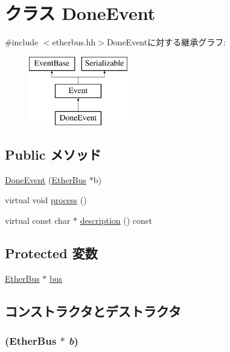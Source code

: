 \hypertarget{classEtherBus_1_1DoneEvent}{
\section{クラス DoneEvent}
\label{classEtherBus_1_1DoneEvent}
}


{\ttfamily \#include $<$etherbus.hh$>$}DoneEventに対する継承グラフ:\begin{figure}[H]
\begin{center}
\leavevmode
\includegraphics[height=3cm]{classEtherBus_1_1DoneEvent}
\end{center}
\end{figure}
\subsection*{Public メソッド}
\begin{DoxyCompactItemize}
\item 
\hyperlink{classEtherBus_1_1DoneEvent_ac6351165b315688e68ffabd031732512}{DoneEvent} (\hyperlink{classEtherBus}{EtherBus} $\ast$b)
\item 
virtual void \hyperlink{classEtherBus_1_1DoneEvent_a6780fc1879338e1ff38faf7279ec6a0b}{process} ()
\item 
virtual const char $\ast$ \hyperlink{classEtherBus_1_1DoneEvent_a130ddddf003422b413e2e891b1b80e8f}{description} () const 
\end{DoxyCompactItemize}
\subsection*{Protected 変数}
\begin{DoxyCompactItemize}
\item 
\hyperlink{classEtherBus}{EtherBus} $\ast$ \hyperlink{classEtherBus_1_1DoneEvent_abd467a939ce7cff4543502c412d5b1d6}{bus}
\end{DoxyCompactItemize}


\subsection{コンストラクタとデストラクタ}
\hypertarget{classEtherBus_1_1DoneEvent_ac6351165b315688e68ffabd031732512}{
\subsubsection[{DoneEvent}]{ ({\bf EtherBus} $\ast$ {\em b})}}
\label{classEtherBus_1_1DoneEvent_ac6351165b315688e68ffabd031732512}



